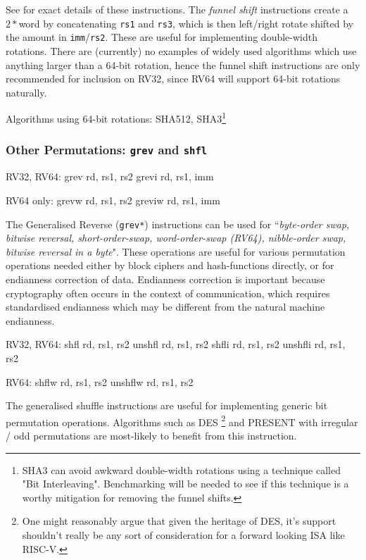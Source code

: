 See \cite[Section 2.9.3]{riscv:bitmanip:draft} for exact details of
these instructions.
The {\em funnel shift} instructions create a $2*$\XLEN word by
concatenating {\tt rs1} and {\tt rs3}, which is then
left/right rotate shifted by the amount in {\tt imm}/{\tt rs2}.
These are useful for implementing double-width rotations.
There are (currently) no examples of widely used algorithms which
use anything larger than a 64-bit rotation, hence the funnel shift
instructions are only recommended for inclusion on RV32, since RV64
will support 64-bit rotations naturally.

Algorithms using 64-bit rotations:
SHA512,
SHA3\footnote{SHA3 can avoid awkward double-width rotations using a
technique called "Bit Interleaving". Benchmarking will be needed to
see if this technique is a worthy mitigation for removing the funnel shifts.}

\subsubsection{Other Permutations: {\tt grev} and {\tt shfl}}

\begin{cryptobitmanipisa}
RV32, RV64:
    grev rd, rs1, rs2
    grevi rd, rs1, imm

RV64 only:
    grevw rd, rs1, rs2
    greviw rd, rs1, imm
\end{cryptobitmanipisa}

The Generalised Reverse ({\tt grev*}) instructions can be used for 
``{\em byte-order swap, bitwise reversal, short-order-swap,
word-order-swap (RV64), nibble-order swap, bitwise reversal in a byte}".
These operations are useful for various permutation operations
needed either by block ciphers and hash-functions directly, or for
endianness correction of data.
Endianness correction is important because
cryptography often occurs in the context of communication, which requires
standardised endianness which may be different from the natural machine
endianness.


\begin{cryptobitmanipisa}
RV32, RV64:
    shfl    rd, rs1, rs2
    unshfl  rd, rs1, rs2
    shfli   rd, rs1, rs2
    unshfli rd, rs1, rs2

RV64:
    shflw   rd, rs1, rs2
    unshflw rd, rs1, rs2
\end{cryptobitmanipisa}

The generalised shuffle instructions are useful for implementing
generic bit permutation operations.
Algorithms such as 
DES \footnote{
One might reasonably argue that given the heritage of DES, it's support
shouldn't really be any sort of consideration for a forward looking
ISA like RISC-V.
}
and
PRESENT\cite{block:present} with
irregular / odd permutations are most-likely to benefit from this
instruction.

